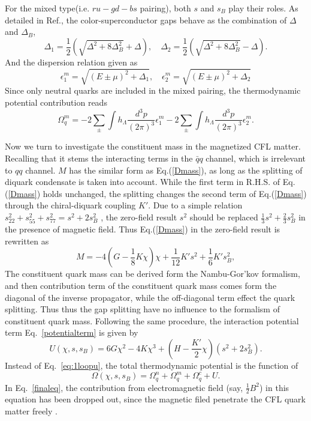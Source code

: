 \documentclass[prd, showpacs,nofootinbib,amsmath,amssymb,12pt]{revtex4}
\begin{document}
For the mixed type(i.e. $ru-gd-bs$ pairing),  both $s$ and $s_B$ play their roles.
As detailed in Ref.\cite{ferrer2006color,noronha2007color},
the color-superconductor gaps behave as the combination of $\Delta$ and $\Delta_B$,
\begin{equation}
\Delta_{1}=\frac{1}{2}(\sqrt{\Delta^2 + 8\Delta_B^2} + \Delta),\quad
\Delta_{2}=\frac{1}{2}(\sqrt{\Delta^2 + 8\Delta_B^2} - \Delta).
\end{equation}
And the dispersion relation given as
\begin{equation}
\epsilon^m_1=\sqrt{(E\pm\mu)^2+\Delta_1},\quad \epsilon^m_2=\sqrt{(E\pm\mu)^2+\Delta_2}
\end{equation}
Since only neutral quarks are included  in the mixed pairing, 
the thermodynamic potential contribution reads \cite{noronha2007color}
\begin{equation}
\Omega^m_q=-2\sum_{\pm}\int h_{\Lambda}\frac{d^3p}{(2\pi)^3}  \epsilon^m_1 -2\sum_{\pm}\int h_{\Lambda}\frac{d^3p}{(2\pi)^3}  \epsilon^m_2.
\end{equation}

Now we turn to investigate the constituent  mass in the magnetized CFL matter.
Recalling that it stems the interacting terms in the $\bar{q}q$ channel, which is irrelevant to
$qq$ channel. $M$ has the similar form as Eq.(\ref{Dmass}), as long as the  splitting of
diquark condensate is taken into account.
While the first term in R.H.S. of  Eq.(\ref{Dmass}) 
holds unchanged, the splitting  changes the second term of Eq.(\ref{Dmass})
through the chiral-diquark coupling $K'$.
Due to  a simple relation $s^2_{22}+s^2_{55}+s^2_{77} = s^2 + 2s_B^2$ , 
the zero-field result $s^2$ should be replaced  $\frac{1}{3}s^2+\frac{2}{3}s^2_{B}$
in the presence of magnetic field.
Thus Eq.(\ref{Dmass}) in the zero-field result is rewritten as
\begin{equation}
M=-4(G-\frac{1}{8}K\chi)\chi+\frac{1}{12}K's^2+\frac{1}{6}K's^2_B,
\end{equation}
The constituent quark mass can be derived form the Nambu-Gor'kov formalism, and then contribution term of the constituent quark mass comes form the diagonal of the inverse propagator, while the off-diagonal term effect  the quark splitting\cite{abuki2010nambu}.
Thus thus the gap splitting have no influence to the formalism of constituent quark mass.  
Following the same procedure, the interaction potential term Eq.~\eqref{potentialterm} is given by
\begin{equation}
U(\chi,s,s_B)=6G\chi^2-4K\chi^3+(H-\frac{K'}{2}\chi)(s^2+2s^2_B).
\end{equation}
Instead of Eq.~\eqref{eq:1loopu}, the  total thermodynamic potential is the function of 
\begin{equation}
\label{finaleq}
\Omega(\chi,s,s_B)=\Omega^n_q+\Omega^m_q+\Omega^c_q+U.
\end{equation}
In Eq.~\eqref{finaleq}, the contribution from electromagnetic field (say, $\frac{1}{2}B^2$) in this equation has been dropped out, since the magnetic filed penetrate the CFL quark matter freely \cite{ferrer2005magnetic,  ferrer2006color,  ferrer2007magnetic}. 
\end{document}
